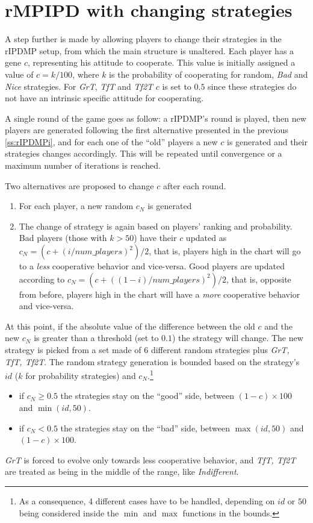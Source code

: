\documentclass[journal,10pt,twoside]{IEEEtran}
\begin{document}
\section{rMPIPD with changing strategies} \label{s:crIPDMP}
A step further is made by allowing players to change their strategies in the rIPDMP setup, from which the main structure is unaltered.
Each player has a gene $c$, representing his attitude to cooperate. This value is initially assigned a value of $c=k/100$, where $k$ is the probability of cooperating for random, \textit{Bad} and \textit{Nice} strategies. For \textit{GrT}, \textit{TfT} and \textit{Tf2T} $c$ is set to $0.5$ since these strategies do not have an intrinsic specific attitude for cooperating.
 
A single round of the game goes as follow: a rIPDMP's round is played, then new players are generated following the first alternative presented in the previous \autoref{ss:rIPDMPi}, and for each one of the ``old'' players a new $c$ is generated and their strategies changes accordingly. This will be repeated until convergence or a maximum number of iterations is reached.

Two alternatives are proposed to change $c$ after each round.
\begin{enumerate}
    \item For each player, a new random $c_N$ is generated
    \item The change of strategy is again based on players' ranking and probability. Bad players (those with $k>50$) have their $c$ updated as
    $c_N = (c+(i/num\_players)^2)/2$, that is, players high in the chart will go to a \textit{less} cooperative behavior and vice-versa.
    Good players are updated according to $c_N = (c+((1-i)/num\_players)^2)/2$, that is, opposite from before, players high in the chart will have a \textit{more} cooperative behavior and vice-versa.
\end{enumerate}

At this point, if the absolute value of the difference between the old $c$ and the new $c_N$ is greater than a threshold (set to $0.1$) the strategy will change. 
The new strategy is picked from a set made of $6$ different random strategies plus \textit{GrT, TfT, Tf2T}. %
The random strategy generation is bounded based on the strategy's $id$ ($k$ for probability strategies) and $c_N$.\footnote{As a consequence, 4 different cases have to be handled, depending on $id$ or $50$ being considered inside the $\min$ and $\max$ functions in the bounds.}
\begin{itemize}
    \item if $c_N \ge 0.5$ the strategies stay on the ``good'' side, between $(1-c)\times 100$ and $\min(id,50)$.
    \item if $c_N < 0.5$ the strategies stay on the ``bad'' side, between $\max(id,50)$ and $(1-c)\times 100$.
\end{itemize}
\textit{GrT} is forced to evolve only towards less cooperative behavior, and \textit{TfT, Tf2T} are treated as being in the middle of the range, like \textit{Indifferent}.
\end{document}
